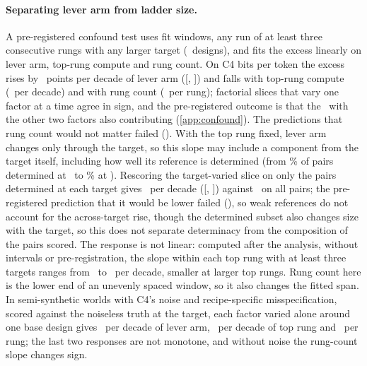\documentclass{article}
\begin{document}
\paragraph{Separating lever arm from ladder size.} A pre-registered confound
test uses fit windows, any run of at least three consecutive rungs with any  %
larger target (\confDesigns\ designs), and fits the excess linearly on lever
arm, top-rung compute and rung count. On C4 bits per token the excess rises by
\confJointLever\ points per decade of lever arm
([\confJointLeverWaldLow, \confJointLeverWaldHigh]) and falls with top-rung
compute (\confJointTop\ per decade) and with rung count (\confJointRungs\ per
rung); factorial slices that vary one factor at a time agree in sign, and the
pre-registered outcome is that the \confOutcome\ with the other two factors also
contributing (\cref{app:confound}). The predictions that rung count would not
matter failed (\confPredFailed). With the top rung fixed, lever arm changes only
through the target, so this slope may include a component from the target
itself, including how well its reference is determined (from
\confDetMin\% of pairs determined at \confDetMinTarget\ to \confDetTop\% at
\targetScaleLabel). Rescoring the target-varied slice on only the pairs
determined at each target gives \ftTargetVariedDetermined\ per decade
([\ftTargetVariedDeterminedLow, \ftTargetVariedDeterminedHigh]) against
\ftTargetVariedAllPairs\ on all pairs; the pre-registered prediction that it
would be lower failed (\ftPredFailed), so weak references do not account for
the across-target rise, though the determined subset also changes size with
the target, so this does not separate determinacy from the composition of the
pairs scored. The response is not linear: computed after the analysis, without
intervals or pre-registration, the slope within each top rung with at least three targets  %
ranges from \phPerTopMin\ to \phPerTopMax\ per decade, smaller at larger top
rungs. Rung count here is the lower end of an unevenly spaced window, so it also
changes the fitted span. In semi-synthetic worlds with C4's noise and
recipe-specific misspecification, scored against the noiseless truth at the
target, each factor varied alone around one base design gives \synthLeverSlope\
per decade of lever arm, \synthTopSlope\ per decade of top rung and
\synthRungsSlope\ per rung; the last two responses are not monotone, and without
noise the rung-count slope changes sign.
\end{document}
